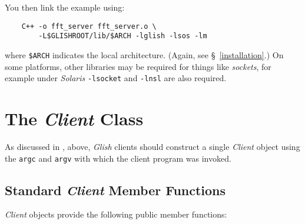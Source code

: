 You then link the example using:
\begin{verbatim}
    C++ -o fft_server fft_server.o \
        -L$GLISHROOT/lib/$ARCH -lglish -lsos -lm
\end{verbatim}
where {\tt \$ARCH} indicates the local architecture. (Again, see \S~\ref{installation}.)
On some platforms, other libraries may be required for things like {\em sockets}, for
example under {\em Solaris} {\tt -lsocket} and {\tt -lnsl} are also required.
\index{FFT server|)}

\section{The {\em Client} Class}
\label{client-class}

As discussed in , above, {\em Glish} clients should
construct a single {\em Client} object using the {\tt argc} and {\tt argv}
with which the client program was invoked.

\subsection{Standard {\em Client} Member Functions}

{\em Client} objects provide the following public member functions:

